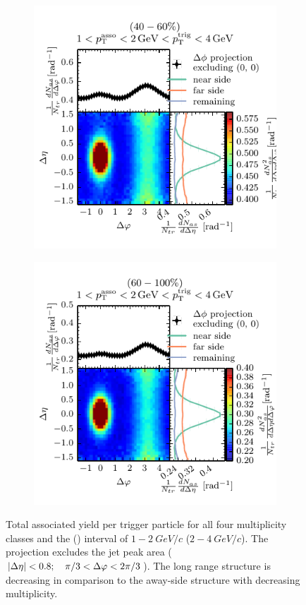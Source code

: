 \begin{figure}
\begin{subfigure}[b]{0.5\textwidth}
    \includegraphics[]{figures/12_24_class2.pdf}
  \end{subfigure}%
  \begin{subfigure}[b]{0.5\textwidth}
    \includegraphics[]{figures/12_24_class3.pdf}
  \end{subfigure}
  \caption[Total associated yield per trigger particle for all four multiplicity classes and the \ptassoc (\pttrig) interval of $1-\SI{2}{GeV/c}$ ($2-\SI{4}{GeV/c}$) and no threshold.]{Total associated yield per trigger particle for all four multiplicity classes and the \ptassoc (\pttrig) interval of $1-\SI{2}{GeV/c}$ ($2-\SI{4}{GeV/c}$). The \dphi projection excludes the jet peak area ($|\Delta\eta| < 0.8;  \quad \pi /3 < \Delta\varphi < 2 \pi /3$). The long range \deta structure is decreasing in comparison to the \gls{away-side} structure with decreasing multiplicity.}
  \label{fig:Y_no_thresh}
\end{figure}

